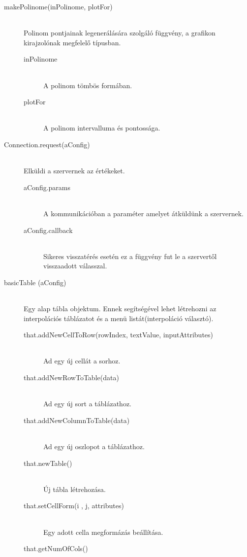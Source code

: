 	\begin{description}
		\item[makePolinome(inPolinome, plotFor)] \hfill \\ 
			Polinom pontjainak legenerálására szolgáló függvény, a grafikon kirajzolónak megfelelő típusban.
			\begin{description}
				\item[inPolinome] \hfill \\ 
					A polinom tömbös formában.
				\item[plotFor] \hfill \\ 
					A polinom intervalluma és pontossága.
			\end{description}
		\item[Connection.request(aConfig)] \hfill \\ 
			Elküldi a szervernek az értékeket.
			\begin{description}
				\item[aConfig.params] \hfill \\
				A kommunikációban a paraméter amelyet átküldünk a szervernek.
				\item[aConfig.callback] \hfill \\
				Sikeres visszatérés esetén ez a függvény fut le a szervertől visszaadott válasszal. 
			\end{description}
		\item[basicTable (aConfig)] \hfill \\ 
			Egy alap tábla objektum. Ennek segítségével lehet létrehozni az interpolációs táblázatot és a menü listát(interpoláció választó).
			\begin{description}
			\item[that.addNewCellToRow(rowIndex, textValue, inputAttributes)] 
				\hfill \\  Ad egy új cellát a sorhoz.
			\item[that.addNewRowToTable(data)]
				\hfill \\ Ad egy új sort a táblázathoz.
			\item[that.addNewColumnToTable(data)]
				\hfill \\ Ad egy új oszlopot a táblázathoz.
			\item[that.newTable()] 
				\hfill \\ Új tábla létrehozása.
			\item[that.setCellForm(i , j, attributes)] 
				\hfill \\ Egy adott cella megformázás beállítása.
			\item[that.getNumOfCols()] 

\end{description}
\end{description}
